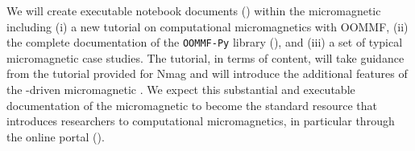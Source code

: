 \begin{workpackage}
\begin{tasklist}
\begin{task}[lead=USO,title=Demonstrator: micromagnetic VRE notebooks,
  id=oommf-tutorial-and-documentation,PM=6,partners={SR,PS},wphases=15-21]
  We will create executable notebook documents
  () within the micromagnetic \VRE
  including (i) a new tutorial on computational micromagnetics with
  OOMMF, (ii) the complete documentation of the \texttt{OOMMF-Py}
  library (),
  and (iii) a set of typical micromagnetic case studies. The tutorial,
  in terms of content, will take guidance from the tutorial provided
  for Nmag \cite{Nmag-tutorial-url} and will introduce the additional
  features of the \Jupyter-driven micromagnetic \VRE. We expect this
  substantial and executable documentation of the micromagnetic \VRE to
  become the standard resource that introduces researchers to
  computational micromagnetics, in particular through the online
  portal ().


\end{task}

\begin{task}[lead=USO,id=oommf-nb-ve,title=Online portal for
  micromagnetic VRE demonstrator,PM=3,partners={SR,JU},wphases=21-24]


\end{task}
\end{tasklist}
\end{workpackage}
